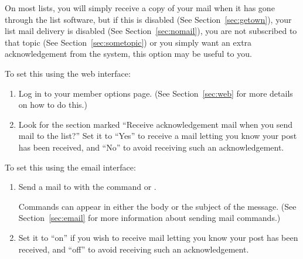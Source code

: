 \documentclass{howto}
\begin{document}
On most lists, you will simply receive a copy of your mail when it has gone
through the list software, but if this is disabled (See 
Section~\ref{sec:getown}), your list mail delivery is disabled (See
Section~\ref{sec:nomail}), you are not subscribed to that topic (See
Section~\ref{sec:sometopic}) or you
simply want an extra acknowledgement from the system, this option may
be useful to you.


To set this using the web interface:
\begin{enumerate}
	\item Log in to your member options page.  (See Section~\ref{sec:web} 
	for more details on how to do this.)
	\item Look for the section marked ``Receive acknowledgement mail when you
	send mail to the list?''  
	Set it to ``Yes'' to receive a mail letting you know your post has been
	received, and  ``No'' to avoid receiving such an acknowledgement.
\end{enumerate}

To set this using the email interface:
\begin{enumerate}
   \item Send a mail to  with the command
    or .

   Commands can appear
   in either the body or the subject of the message.  (See
   Section~\ref{sec:email} for more information about sending mail
   commands.)
	\item Set it to ``on'' if you wish to receive mail letting you know your 
	post has been received, and  ``off'' to avoid receiving such an 
	acknowledgement.
\end{enumerate}

\end{document}
